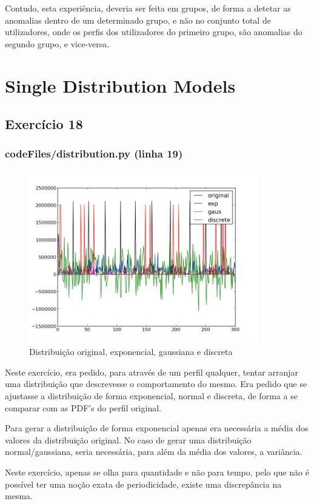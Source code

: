 \documentclass[pdftex,12pt,a4paper]{report}
\begin{document}
Contudo, esta experiência, deveria ser feita em grupos, de forma a detetar as anomalias dentro de um determinado grupo, e não no conjunto total de utilizadores, onde os perfis dos utilizadores do primeiro grupo, são anomalias do segundo grupo, e vice-versa.

\newpage
\section{Single Distribution Models}
\subsection{Exercício 18}
\subsubsection{codeFiles/distribution.py (linha 19)}

\begin{figure}[!htb]
\center
 \includegraphics[width=100mm,scale=1]{distribution/ex18.png}
 \caption{Distribuição original, exponencial, gaussiana e discreta}
 \label{fig:ex18}
\end{figure}

Neste exercício, era pedido, para através de um perfil qualquer, tentar arranjar uma distribuição que descrevesse o comportamento do mesmo. Era pedido que se ajustasse a distribuição de forma exponencial, normal e discreta, de forma a se comparar com as PDF's do perfil original.

Para gerar a distribuição de forma exponencial apenas era necessária a média dos valores da distribuição original. No caso de gerar uma distribuição normal/gaussiana, seria necessária, para além da média dos valores, a variância.

Neste exercício, apenas se olha para quantidade e não para tempo, pelo que não é possível ter uma noção exata de periodicidade, existe uma discrepância na mesma.
\end{document}
